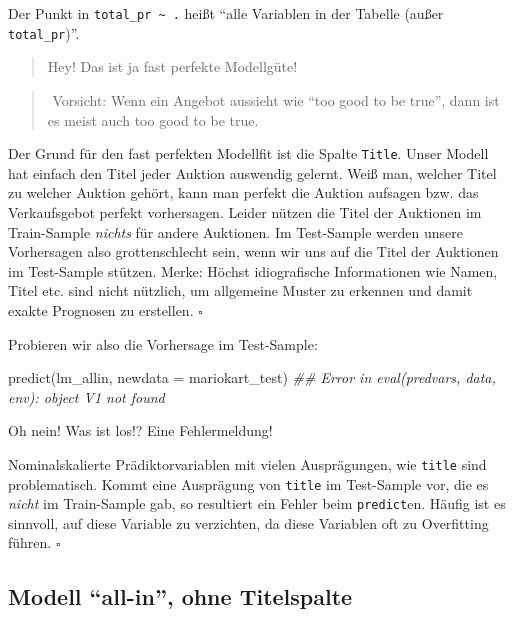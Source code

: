 \documentclass[
  letterpaper,
  twoside,
  open=any]{scrbook}
\newenvironment{Shaded}{\begin{snugshade}}{\end{snugshade}}
\newcommand{\AttributeTok}[1]{\textcolor[rgb]{0.40,0.45,0.13}{#1}}
\newcommand{\DocumentationTok}[1]{\textcolor[rgb]{0.37,0.37,0.37}{\textit{#1}}}
\newcommand{\FunctionTok}[1]{\textcolor[rgb]{0.28,0.35,0.67}{#1}}
\newcommand{\NormalTok}[1]{\textcolor[rgb]{0.00,0.23,0.31}{#1}}
\theoremstyle{definition}
\theoremstyle{definition}
\theoremstyle{definition}
\theoremstyle{remark}
\begin{document}
Der Punkt in \texttt{total\_pr\ \textasciitilde{}\ .} heißt
\enquote{alle Variablen in der Tabelle (außer \texttt{total\_pr})}.

\begin{quote}
{} Hey! Das ist ja fast perfekte Modellgüte!
\end{quote}

\begin{quote}
{}️ Vorsicht: Wenn ein Angebot aussieht wie
\enquote{too good to be true}, dann ist es meist auch too good to be
true.
\end{quote}

Der Grund für den fast perfekten Modellfit ist die Spalte
\texttt{Title}. Unser Modell hat einfach den Titel jeder Auktion
auswendig gelernt. Weiß man, welcher Titel zu welcher Auktion gehört,
kann man perfekt die Auktion aufsagen bzw. das Verkaufsgebot perfekt
vorhersagen. Leider nützen die Titel der Auktionen im Train-Sample
\emph{nichts} für andere Auktionen. Im Test-Sample werden unsere
Vorhersagen also grottenschlecht sein, wenn wir uns auf die Titel der
Auktionen im Test-Sample stützen. Merke: Höchst idiografische
Informationen wie Namen, Titel etc. sind nicht nützlich, um allgemeine
Muster zu erkennen und damit exakte Prognosen zu erstellen. \(\square\)

Probieren wir also die Vorhersage im Test-Sample:

\begin{Shaded}
\begin{Highlighting}[]
\FunctionTok{predict}\NormalTok{(lm\_allin, }\AttributeTok{newdata =}\NormalTok{ mariokart\_test)}
\DocumentationTok{\#\# Error in eval(predvars, data, env): object \textquotesingle{}V1\textquotesingle{} not found}
\end{Highlighting}
\end{Shaded}

Oh nein! Was ist los!? Eine Fehlermeldung!

Nominalskalierte Prädiktorvariablen mit vielen Ausprägungen, wie
\texttt{title} sind problematisch. Kommt eine Ausprägung von
\texttt{title} im Test-Sample vor, die es \emph{nicht} im Train-Sample
gab, so resultiert ein Fehler beim \texttt{predict}en. Häufig ist es
sinnvoll, auf diese Variable zu verzichten, da diese Variablen oft zu
Overfitting führen. \(\square\)

\subsection{\texorpdfstring{Modell \enquote{all-in}, ohne
Titelspalte}{Modell ``all-in'', ohne Titelspalte}}\label{modell-all-in-ohne-titelspalte}
\end{document}
